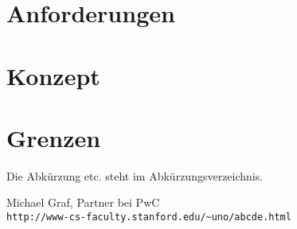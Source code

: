 \documentclass[nomenclature, 150]{HSMW-Thesis}
\begin{document}
\chapter{Anforderungen}


\chapter{Konzept}
%
%


\chapter{Grenzen}
	Die Abkürzung etc. steht im Abkürzungsverzeichnis.

\Anhang


\begin{thebibliography}{99}
		Michael Graf, Partner bei PwC
		\\\texttt{http://www-cs-faculty.stanford.edu/\~{}uno/abcde.html}
		
\end{thebibliography}
\end{document}
